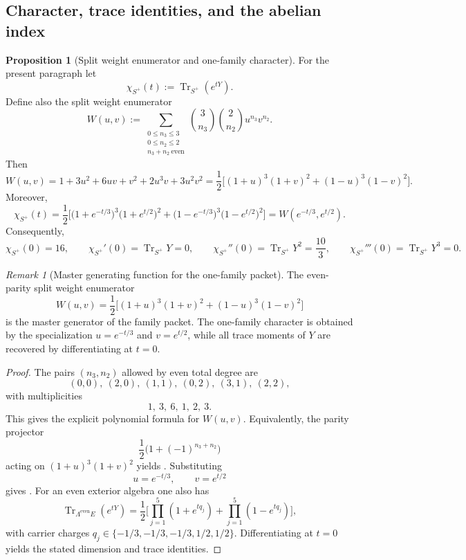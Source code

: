 \documentclass[11pt,a4paper]{article}
\theoremstyle{definition}
\newtheorem{proposition}[theorem]{Proposition}
\theoremstyle{remark}
\newtheorem*{remark}{Remark}
\DeclareMathOperator{\tr}{Tr}
\begin{document}
\subsection{Character, trace identities, and the abelian index}

\begin{proposition}[Split weight enumerator and one-family character]
\label{prop:split-weight-enumerator}
For the present paragraph let
\[
\chi_{S^+}(t):=\tr_{S^+}(e^{tY}).
\]
Define also the split weight enumerator
\[
W(u,v)
:=
\sum_{\substack{0\le n_3\le 3\\ 0\le n_2\le 2\\ n_3+n_2\ \mathrm{even}}}
\binom{3}{n_3}\binom{2}{n_2}u^{n_3}v^{n_2}.
\]
Then
\begin{equation}
\label{eq:split-weight-enumerator}
W(u,v)
=
1+3u^2+6uv+v^2+2u^3v+3u^2v^2
=
\frac12\Big[(1+u)^3(1+v)^2+(1-u)^3(1-v)^2\Big].
\end{equation}
Moreover,
\begin{equation}
\label{eq:family-character}
\chi_{S^+}(t)
=
\frac12\Big[
\bigl(1+e^{-t/3}\bigr)^3\bigl(1+e^{t/2}\bigr)^2
+
\bigl(1-e^{-t/3}\bigr)^3\bigl(1-e^{t/2}\bigr)^2
\Big]
=
W(e^{-t/3},e^{t/2}).
\end{equation}
Consequently,
\[
\chi_{S^+}(0)=16,
\qquad
\chi_{S^+}'(0)=\tr_{S^+}Y=0,
\qquad
\chi_{S^+}''(0)=\tr_{S^+}Y^2=\frac{10}{3},
\qquad
\chi_{S^+}'''(0)=\tr_{S^+}Y^3=0.
\]
\end{proposition}

\begin{remark}[Master generating function for the one-family packet]
The even-parity split weight enumerator
\[
W(u,v)=\frac12\bigl[(1+u)^3(1+v)^2+(1-u)^3(1-v)^2\bigr]
\]
is the master generator of the family packet. The one-family character is obtained by the
specialization $u=e^{-t/3}$ and $v=e^{t/2}$, while all trace moments of $Y$ are recovered by
differentiating at $t=0$.
\end{remark}

\begin{proof}
The pairs $(n_3,n_2)$ allowed by even total degree are
\[
(0,0),\ (2,0),\ (1,1),\ (0,2),\ (3,1),\ (2,2),
\]
with multiplicities
\[
1,\ 3,\ 6,\ 1,\ 2,\ 3.
\]
This gives the explicit polynomial formula for $W(u,v)$. Equivalently, the parity projector
\[
\frac12\bigl(1+(-1)^{n_3+n_2}\bigr)
\]
acting on $(1+u)^3(1+v)^2$ yields . Substituting
\[
u=e^{-t/3},
\qquad
v=e^{t/2}
\]
gives . For an even exterior algebra one also has
\[
\tr_{\Lambda^{\mathrm{even}}E}(e^{tY})
=
\frac12\Big[\prod_{j=1}^5(1+e^{tq_j})+\prod_{j=1}^5(1-e^{tq_j})\Big],
\]
with carrier charges $q_j\in\{-1/3,-1/3,-1/3,1/2,1/2\}$. Differentiating at $t=0$ yields the stated dimension and trace identities.
\end{proof}
\end{document}
